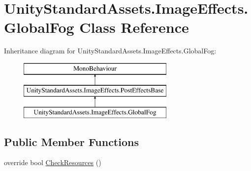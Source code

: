 \hypertarget{class_unity_standard_assets_1_1_image_effects_1_1_global_fog}{}\section{Unity\+Standard\+Assets.\+Image\+Effects.\+Global\+Fog Class Reference}
\label{class_unity_standard_assets_1_1_image_effects_1_1_global_fog}
Inheritance diagram for Unity\+Standard\+Assets.\+Image\+Effects.\+Global\+Fog\+:\begin{figure}[H]
\begin{center}
\leavevmode
\includegraphics[height=3.000000cm]{class_unity_standard_assets_1_1_image_effects_1_1_global_fog}
\end{center}
\end{figure}
\subsection*{Public Member Functions}
\begin{DoxyCompactItemize}
\item 
override bool \mbox{\hyperlink{class_unity_standard_assets_1_1_image_effects_1_1_global_fog_af644a7d78d3aef80dbc6faa274051776}{Check\+Resources}} ()
\end{DoxyCompactItemize}
